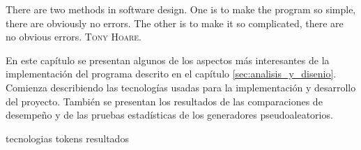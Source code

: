 %
%
%

{
  \epigrafe
  {%
    There are two methods in software design. One is to make the program so
    simple, there are obviously no errors. The other is to make it so
    complicated, there are no obvious errors.%
  }
  {%
    \textsc{Tony Hoare}.%
  }
}

\noindent
En este capítulo se presentan algunos de los aspectos más interesantes de
la implementación del programa descrito en el capítulo
\ref{sec:analisis_y_disenio}. Comienza describiendo las tecnologías
usadas para la implementación y desarrollo del proyecto. También se presentan
los resultados de las comparaciones de desempeño y de las pruebas estadísticas
de los generadores pseudoaleatorios.

{tecnologias}
{tokens}
{resultados}
